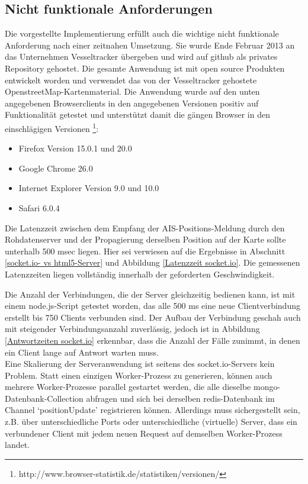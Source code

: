 \subsection{Nicht funktionale Anforderungen}
Die vorgestellte Implementierung erfüllt auch die wichtige nicht funktionale Anforderung nach einer zeitnahen Umsetzung. Sie wurde Ende Februar 2013 an das Unternehmen Vesseltracker übergeben und wird auf github als privates Repository gehostet.
Die gesamte Anwendung ist mit open source Produkten entwickelt worden und verwendet das von der Vesseltracker gehostete OpenstreetMap-Kartenmaterial.\newline
Die Anwendung wurde auf den unten angegebenen Browserclients in den angegebenen Versionen positiv auf Funktionalität getestet und unterstützt damit die gängen Browser in den einschlägigen Versionen \footnote{http://www.browser-statistik.de/statistiken/versionen/}:
\begin{itemize}
\item Firefox Version 15.0.1 und 20.0
\item Google Chrome 26.0
\item Internet Explorer Version 9.0 und 10.0
\item Safari 6.0.4
\end {itemize}

Die Latenzzeit zwischen dem Empfang der AIS-Positions-Meldung durch den Rohdatenserver und der Propagierung derselben Position auf der Karte sollte unterhalb 500 msec liegen. Hier sei verwiesen auf die Ergebnisse in Abschnitt \ref{socket.io- vs html5-Server} und Abbildung \ref{Latenzzeit socket.io}. Die gemessenen Latenzzeiten liegen vollständig innerhalb der geforderten Geschwindigkeit.


Die Anzahl der Verbindungen, die der Server gleichzeitig bedienen kann, ist mit einem node.js-Script getestet worden, das alle 500 ms eine neue Clientverbindung erstellt bis 750 Clients verbunden sind. Der Aufbau der Verbindung geschah auch mit steigender Verbindungsanzahl zuverlässig, jedoch ist in Abbildung \ref{Antwortzeiten socket.io} erkennbar, dass die Anzahl der Fälle zunimmt, in denen ein Client lange auf Antwort warten muss.
\\Eine Skalierung der Serveranwendung ist seitens des socket.io-Servers kein Problem. Statt einen einzigen Worker-Prozess zu generieren, können auch mehrere Worker-Prozesse parallel gestartet werden, die alle dieselbe mongo-Datenbank-Collection abfragen und sich bei derselben redis-Datenbank im Channel ‘positionUpdate’ registrieren können. Allerdings muss sichergestellt sein, z.B.  über unterschiedliche Ports oder unterschiedliche (virtuelle) Server, dass ein verbundener Client mit jedem neuen Request auf demselben Worker-Prozess landet.

